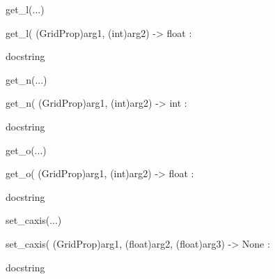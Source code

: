 \documentclass[letterpaper,10pt,english]{sphinxmanual}
\begin{document}
\begin{description}
\begin{description}
\begin{DUlineblock}{0em}
\begin{DUlineblock}{\DUlineblockindent}
\begin{DUlineblock}{\DUlineblockindent}
\item[] 
\end{DUlineblock}
\end{DUlineblock}
\item[] get\_l(...)
\item[]
\begin{DUlineblock}{\DUlineblockindent}
\item[] get\_l( (GridProp)arg1, (int)arg2) -\textgreater{} float :
\item[]
\begin{DUlineblock}{\DUlineblockindent}
\item[] docstring
\item[] 
\end{DUlineblock}
\end{DUlineblock}
\item[] get\_n(...)
\item[]
\begin{DUlineblock}{\DUlineblockindent}
\item[] get\_n( (GridProp)arg1, (int)arg2) -\textgreater{} int :
\item[]
\begin{DUlineblock}{\DUlineblockindent}
\item[] docstring
\item[] 
\end{DUlineblock}
\end{DUlineblock}
\item[] get\_o(...)
\item[]
\begin{DUlineblock}{\DUlineblockindent}
\item[] get\_o( (GridProp)arg1, (int)arg2) -\textgreater{} float :
\item[]
\begin{DUlineblock}{\DUlineblockindent}
\item[] docstring
\item[] 
\end{DUlineblock}
\end{DUlineblock}
\item[] set\_caxis(...)
\item[]
\begin{DUlineblock}{\DUlineblockindent}
\item[] set\_caxis( (GridProp)arg1, (float)arg2, (float)arg3) -\textgreater{} None :
\item[]
\begin{DUlineblock}{\DUlineblockindent}
\item[] docstring

\end{DUlineblock}
\end{DUlineblock}
\end{DUlineblock}
\end{description}
\end{description}
\end{document}
